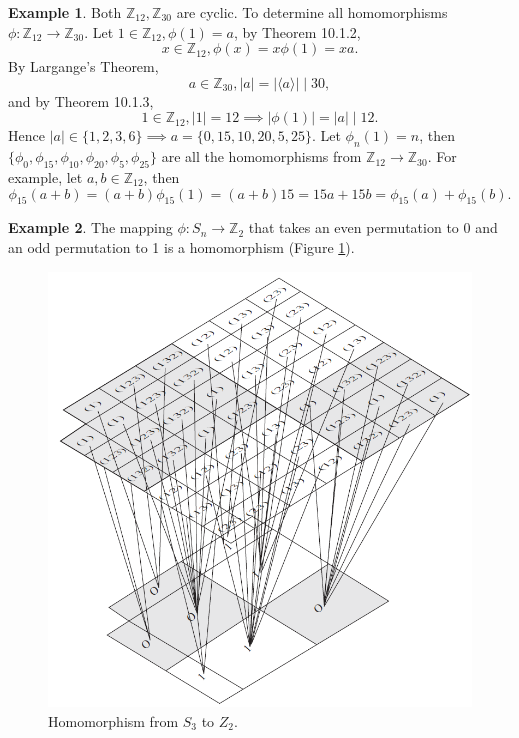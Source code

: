 \documentclass{article}
\theoremstyle{definition}
\newtheorem{example}{Example}[section]
\begin{document}
    \begin{example}
        Both $\mathbb{Z}_{12},\mathbb{Z}_{30}$ are cyclic. To determine all homomorphisms $\phi:\mathbb{Z}_{12}\to\mathbb{Z}_{30}$.  Let $1\in\mathbb{Z}_{12},\phi(1)=a$, by Theorem 10.1.2,
        \begin{equation*}
             x\in\mathbb{Z}_{12},\phi(x) = x\phi(1) = xa.
        \end{equation*}
        By Largange's Theorem, 
        \begin{equation*}
            a\in\mathbb{Z}_{30}, |a|=|\langle a \rangle|\mid30,
        \end{equation*}
        and by Theorem 10.1.3, 
        \begin{equation*}
            1\in\mathbb{Z}_{12}, |1|=12 \implies |\phi(1)|=|a|\mid12. 
        \end{equation*}
        Hence $|a|\in\{1,2,3,6\} \implies a=\{0,15,10,20,5,25\}$. Let $\phi_n(1)=n$, then $\{\phi_0,\phi_{15},\phi_{10},\phi_{20},\phi_5,\phi_{25}\}$ are all the homomorphisms from $\mathbb{Z}_{12}\to\mathbb{Z}_{30}$. For example, let $a,b\in\mathbb{Z}_{12}$, then
        \begin{equation*}
             \phi_{15}(a+b)=(a+b)\phi_{15}(1)=(a+b)15 = 15a+15b = \phi_{15}(a)+\phi_{15}(b).
        \end{equation*}
    \end{example}
    
    \begin{example}
        The mapping $\phi:S_n \to \mathbb{Z}_2$ that takes an even permutation to 0 and an odd permutation to 1 is a homomorphism (Figure \ref{fig10.1}).
    \end{example}
    
    \begin{figure}[!htbp]
        \centering
        \includegraphics[width=0.8\linewidth]{figures/fig10.2.png}
        \caption{Homomorphism from $S_3$ to $Z_2$.}
        \label{fig10.1}
    \end{figure}
    
\end{document}
